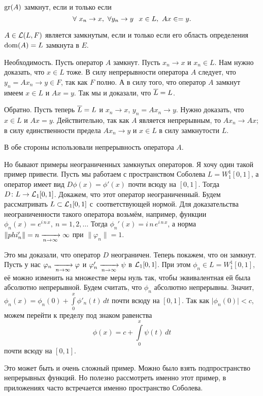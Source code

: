   $\operatorname{gr}(A)$  замкнут, если и только если
\[
  \forall\ x_n\to x,\ \forall y_n\to y\pau x\in L,\ Ax\in=y.
\]

\begin{The}
  $A\in \mathcal L(L,F)$ является замкнутым, если и только если его область определения $\operatorname{dom}(A) = L$ замкнута в $E$.
\end{The}
\begin{Proof}
  Необходимость. Пусть оператор $A$ замкнут. Пусть $x_n\to x$ и $x_n\in L$. Нам нужно доказать, что $x\in L$ тоже.
  В силу непрерывности оператора $A$ следует, что $y_n = Ax_n\to y\in F$, так как $F$ полно. А в силу того, что оператор $A$ замкнут имеем $x\in L$ и $Ax = y$. Так мы и доказали, что $\overline{L}=L$.

Обратно. Пусть теперь $\overline{L}=L$ и $x_n\to x$, $y_n=Ax_n\to y$. Нужно доказать, что $x\in L$ и $Ax = y$. Действительно, так как $A$ является непрерывным, то $A x_n\to Ax$; в силу единственности предела $A x_n\to y$ и $x\in L$ в силу замкнутости $L$.
\end{Proof}

В обе стороны использовали непрерывность оператора $A$.

Но бывают примеры неограниченных замкнутых операторов. Я хочу один такой пример привести.
Пусть мы работаем с пространством Соболева $L = W_1^1[0,1]$, а оператор имеет вид $D\phi(x) = \phi'(x)$ почти всюду на $[0,1]$. Тогда $D\colon L\rightarrow \mathcal L_1[0,1]$. Докажем, что этот оператор неограниченный. Будем рассматривать $L\subset \mathcal L_1[0,1]$ с~соответствующей нормой. Для доказательства неограниченности такого оператора возьмём, например, функции $\phi_n(x)= e^{i\,n\,x},\ n=1,2,\dots$ Тогда $\phi_n'(x) = i\,n\,e^{i\,n\,x}$, а норма $\|phi'_n\| = n\xrightarrow[n\rightarrow\infty]{}\infty$ при $\|\varphi_n\|=1$.

Это мы доказали, что оператор $D$ неограничен. Теперь покажем, что он замкнут.  Пусть у нас $\varphi_n\xrightarrow[n\rightarrow\infty]{}\varphi$ и $\varphi'_n\xrightarrow[n\rightarrow\infty]{}\psi$ в $\mathcal L_1[0,1]$. При этом $\phi_n\in L = W_1^1[0,1]$, её можно изменить на множестве меры нуль так, чтобы эквивалентная ей была абсолютно непрерывной.
Будем считать, что $\phi_n$ абсолютно непрерывны. Значит, $\phi_n(x) = \phi_n(0) + \int\limits_0^x\phi'_n(t)\,dt$ почти всюду на $[0,1]$. Так как $\big|\phi_n(0)\big|<c$, можем перейти к пределу под знаком равенства
\[
  \phi(x) = c + \int\limits_0^x\psi(t)\,dt
\]
почти всюду на $[0,1]$.

Это может быть и очень сложный пример. Можно было взять подпространство непрерывных функций. Но полезно рассмотреть именно этот пример, в приложениях часто встречается именно пространство Соболева.

